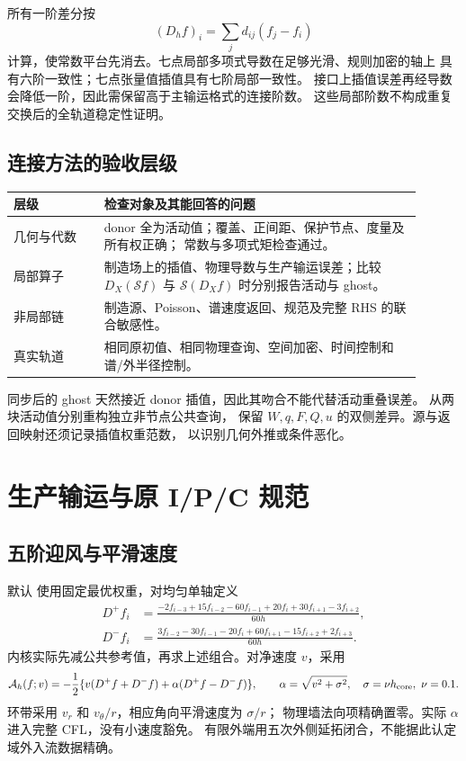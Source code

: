 \documentclass[UTF8,fontset=fandol,11pt,a4paper]{ctexart}
\newcommand{\code}[1]{\texttt{\detokenize{#1}}}
\begin{document}
所有一阶差分按
\begin{equation}
 (D_hf)_i=\sum_jd_{ij}(f_j-f_i)
 \label{eq:constant-difference}
\end{equation}
计算，使常数平台先消去。七点局部多项式导数在足够光滑、规则加密的轴上
具有六阶一致性；七点张量值插值具有七阶局部一致性。
接口上插值误差再经导数会降低一阶，因此需保留高于主输运格式的连接阶数。
这些局部阶数不构成重复交换后的全轨道稳定性证明。

\subsection{连接方法的验收层级}
\begin{center}
\begin{tabular}{p{0.20\linewidth}p{0.70\linewidth}}
\toprule
层级 & 检查对象及其能回答的问题\\
\midrule
几何与代数 & donor 全为活动值；覆盖、正间距、保护节点、度量及所有权正确；
常数与多项式矩检查通过。\\
局部算子 & 制造场上的插值、物理导数与生产输运误差；比较
$D_X(\mathcal Sf)$ 与 $\mathcal S(D_Xf)$ 时分别报告活动与 ghost。\\
非局部链 & 制造源、Poisson、谱速度返回、规范及完整 RHS 的联合敏感性。\\
真实轨道 & 相同原初值、相同物理查询、空间加密、时间控制和谱/外半径控制。\\
\bottomrule
\end{tabular}
\end{center}
同步后的 ghost 天然接近 donor 插值，因此其吻合不能代替活动重叠误差。
\code{audit.m} 从两块活动值分别重构独立非节点公共查询，
保留 $W,q,F,Q,u$ 的双侧差异。源与返回映射还须记录插值权重范数，
以识别几何外推或条件恶化。

\clearpage
\section{生产输运与原 I/P/C 规范}
\label{sec:gauge}
\subsection{五阶迎风与平滑速度}
默认 \code{linear5} 使用固定最优权重，对均匀单轴定义
\begin{align}
 D^+f_i&=\frac{-2f_{i-3}+15f_{i-2}-60f_{i-1}
              +20f_i+30f_{i+1}-3f_{i+2}}{60h},\\
 D^-f_i&=\frac{3f_{i-2}-30f_{i-1}-20f_i
              +60f_{i+1}-15f_{i+2}+2f_{i+3}}{60h}.
\end{align}
内核实际先减公共参考值，再求上述组合。对净速度 $v$，采用
\begin{equation}
 \mathcal A_h(f;v)=
 -\frac12\{v(D^+f+D^-f)+\alpha(D^+f-D^-f)\},\qquad
 \alpha=\sqrt{v^2+\sigma^2},\quad \sigma=\nu h_{\rm core},\ \nu=0.1.
 \label{eq:lf}
\end{equation}
环带采用 $v_r$ 和 $v_\theta/r$，相应角向平滑速度为 $\sigma/r$；
物理墙法向项精确置零。实际 $\alpha$ 进入完整 CFL，没有小速度豁免。
有限外端用五次外侧延拓闭合，不能据此认定域外入流数据精确。
\end{document}
